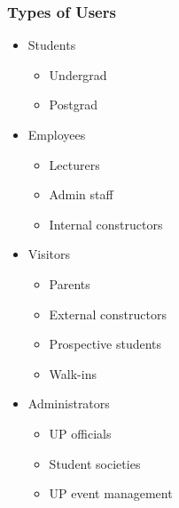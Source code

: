 \documentclass[12pt, a4paper]{article}
\begin{document}
		\subsubsection{Types of Users}
			\begin{itemize}
				\item Students
				\begin{itemize}
					\item Undergrad
					\item Postgrad
				\end{itemize}
				
				\item Employees
				\begin{itemize}
					\item Lecturers
					\item Admin staff
					\item Internal constructors
				\end{itemize}
				
				\item Visitors
				\begin{itemize}
					\item Parents
					\item External constructors
					\item Prospective students
					\item Walk-ins
				\end{itemize}
				
				\item Administrators
				\begin{itemize}
					\item UP officials
					\item Student societies
					\item UP event management
				\end{itemize}
			\end{itemize}
\end{document}
